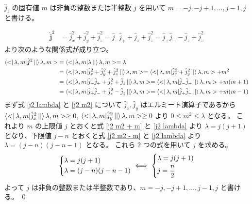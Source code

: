 \documentclass[uplatex,dvipdfmx,a4paper,11pt]{jlreq}
\makeatletter
\numberwithin{equation}{section}
\theoremstyle{definition}
\renewenvironment{proof}[1][\proofname]{\par
  \normalfont
  \topsep6\p@\@plus6\p@ \trivlist
  \item[\hskip\labelsep{\bfseries #1}\@addpunct{\bfseries}]\ignorespaces\quad\par
}{%
  \qed\endtrivlist\@endpefalse
}
\renewcommand\proofname{証明}
\makeatother
\begin{document}
\begin{proposition}
  $\hat{j}_z$ の固有値 $m$ は非負の整数または半整数 $j$ を用いて $m = -j,-j+1,\ldots,j-1,j$ と書ける。
\end{proposition}
\begin{proof}
  \begin{align}
    \hat{\bm{j}}^2 & = \hat{j}_x^2 + \hat{j}_y^2 + \hat{j}_z^2 = \hat{j}_-\hat{j}_+ + \hat{j}_z + \hat{j}_z^2 = \hat{j}_+\hat{j}_- - \hat{j}_z + \hat{j}_z^2
  \end{align}
  より次のような関係式が成り立つ。
  \begin{align}
    \bra<\lambda, m|\hat{\bm{j}}^2\ket|\lambda, m> & = \bra<\lambda, m|\lambda\ket|\lambda, m> = \lambda \label{j2 lambda}                                                                                            \\
                                                   & = \bra<\lambda, m|\hat{j}_x^2 + \hat{j}_y^2 + \hat{j}_z^2\ket|\lambda, m> = \bra<\lambda, m|\hat{j}_x^2 + \hat{j}_y^2\ket|\lambda, m> + m^2 \label{j2 m2}        \\
                                                   & = \bra<\lambda, m|\hat{j}_-\hat{j}_+ + \hat{j}_z^2 + \hat{j}_z\ket|\lambda, m> = \bra<\lambda, m|\hat{j}_-\hat{j}_+\ket|\lambda, m> + m(m + 1) \label{j2 m2 + m} \\
                                                   & = \bra<\lambda, m|\hat{j}_+\hat{j}_- + \hat{j}_z^2 - \hat{j}_z\ket|\lambda, m> = \bra<\lambda, m|\hat{j}_+\hat{j}_-\ket|\lambda, m> + m(m - 1) \label{j2 m2 - m}
  \end{align}
  まず式 \eqref{j2 lambda} と \eqref{j2 m2} について $\hat{j}_x, \hat{j}_y$ はエルミート演算子であるから $\bra<\lambda, m|\hat{j}_x^2\ket|\lambda, m> \geq 0$, $\bra<\lambda, m|\hat{j}_y^2\ket|\lambda, m> \geq 0$ より $0 \leq m^2 \leq \lambda$ となる。
  これより $m$ の上限値 $j$ とおくと式 \eqref{j2 m2 + m} と \eqref{j2 lambda} より $\lambda = j(j + 1)$ となり、下限値 $j - n$ とおくと式 \eqref{j2 m2 - m} と \eqref{j2 lambda} より $\lambda = (j - n)(j - n - 1)$ となる。
  これら 2 つの式を用いて $j$ を求める。
  \begin{align}
    \begin{dcases}
      \lambda = j(j + 1) \\
      \lambda = (j - n)(j - n - 1)
    \end{dcases}
    \iff
    \begin{dcases}
      \lambda = j(j + 1) \\
      j = \frac{n}{2}
    \end{dcases}
  \end{align}
  よって $j$ は非負の整数または半整数であり、$m = -j, -j + 1,\ldots, j-1, j$ と書ける。
\end{proof}
\end{document}
